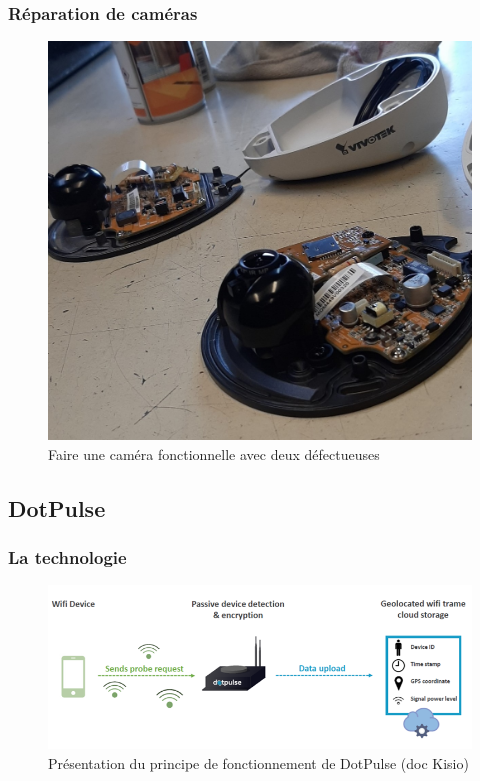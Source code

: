 \documentclass{article}
\begin{document}
        \subsubsection{Réparation de caméras}
            \label{Camera}
            \begin{figure}[!h]
                \centering
                \includegraphics[scale = 0.1]{Images/camera.jpg}
                \caption{Faire une caméra fonctionnelle avec deux défectueuses}
            \end{figure}


    \pagebreak
    \subsection{DotPulse}

        \subsubsection{La technologie}

            \label{DotPulse_Technologie}
            \begin{figure}[!h]
                \centering
                \includegraphics[scale = 0.4]{Images/principe_dotPulse.png}
                \caption{Présentation du principe de fonctionnement de DotPulse (doc Kisio)}
            \end{figure}
\end{document}
